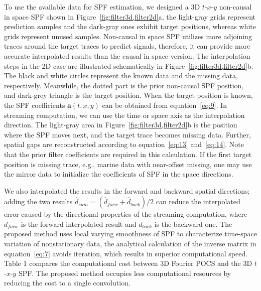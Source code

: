 To use the available data for SPF estimation, we designed a 3D
$t$-$x$-$y$ non-causal in space SPF shown in
Figure~\ref{fig:filter3d,filter2d}a, the light-gray grids represent
prediction samples and the dark-gray ones exhibit target positions,
whereas white grids represent unused samples. Non-causal in space SPF
utilizes more adjoining traces around the target traces to predict
signals, therefore, it can provide more accurate interpolated results
than the causal in space version. The interpolation steps in the 2D
case are illustrated schematically in
Figure~\ref{fig:filter3d,filter2d}b. The black and white circles
represent the known data and the missing data,
respectively. Meanwhile, the dotted part is the prior non-causal SPF
position, and dark-grey triangle is the target position. When the
target position is known, the SPF coefficients $\mathbf{a}(t,x,y)$ can
be obtained from equation~\ref{eq:9}.  In streaming computation, we
can use the time or space axis as the interpolation direction. The
light-gray area in Figure~\ref{fig:filter3d,filter2d}b is the position
where the SPF moves next, and the target trace becomes missing
data. Further, spatial gaps are reconstructed according to
equation~\ref{eq:13} and~\ref{eq:14}. Note that the prior filter
coefficients are required in this calculation.  If the first target
position is missing trace, e.g., marine data with near-offset missing,
one may use the mirror data to initialize the coefficients of SPF in
the space directions.

We also interpolated the results in the forward and backward spatial
directions; adding the two results
$\widehat{d}_{sum}=(\widehat{d}_{forw}+\widehat{d}_{back})/2$ can
reduce the interpolated error caused by the directional properties of
the streaming computation, where $d_{forw}$ is the forward
interpolated result and $d_{back}$ is the backward one. The proposed
method uses local varying smoothness of SPF to characterize time-space
variation of nonstationary data, the analytical calculation of the
inverse matrix in equation~\ref{eq:7} avoids iteration, which results
in superior computational speed. Table 1 compares the computational
cost between 3D Fourier POCS \cite[]{Abma06} and the 3D $t$-$x$-$y$
SPF. The proposed method occupies less computational resources by
reducing the cost to a single convolution.

